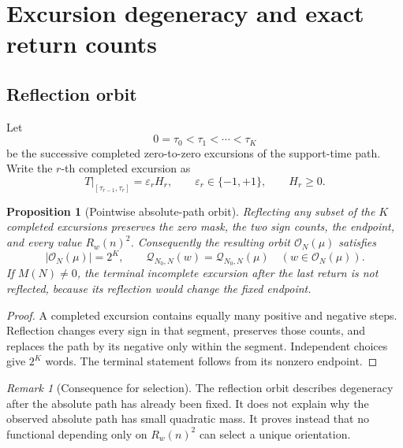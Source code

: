 \documentclass[11pt,reqno]{amsart}
\numberwithin{equation}{section}
\theoremstyle{plain}
\newtheorem{proposition}[theorem]{Proposition}
\theoremstyle{definition}
\theoremstyle{remark}
\newtheorem{remark}[theorem]{Remark}
\newcommand{\QF}{\mathcal Q}
\newcommand{\cO}{\mathcal O}
\begin{document}
\section{Excursion degeneracy and exact return counts}
\label{sec:excursion-geometry}

\subsection{Reflection orbit}
\label{subsec:reflection-orbit}

Let
\begin{equation}
0=\tau_0<\tau_1<\cdots<\tau_K
\label{eq:completed-return-times}
\end{equation}
be the successive completed zero-to-zero excursions of the support-time path.
Write the \(r\)-th completed excursion as
\begin{equation}
T|_{[\tau_{r-1},\tau_r]}=\varepsilon_rH_r,\qquad
\varepsilon_r\in\{-1,+1\},\qquad H_r\geq0.
\label{eq:excursion-decomposition}
\end{equation}

\begin{proposition}[Pointwise absolute-path orbit]
\label{prop:reflection-orbit}
Reflecting any subset of the \(K\) completed excursions preserves the zero
mask, the two sign counts, the endpoint, and every value \(R_w(n)^2\).
Consequently the resulting orbit \(\cO_N(\mu)\) satisfies
\begin{equation}
|\cO_N(\mu)|=2^K,\qquad
\QF_{N_0,N}(w)=\QF_{N_0,N}(\mu)
\quad(w\in\cO_N(\mu)).
\label{eq:reflection-orbit-size}
\end{equation}
If \(M(N)\neq0\), the terminal incomplete excursion after the last return is
not reflected, because its reflection would change the fixed endpoint.
\end{proposition}

\begin{proof}
A completed excursion contains equally many positive and negative steps.
Reflection changes every sign in that segment, preserves those counts, and
replaces the path by its negative only within the segment.  Independent
choices give \(2^K\) words.  The terminal statement follows from its nonzero
endpoint.
\end{proof}

\begin{remark}[Consequence for selection]
\label{rem:reflection-selection-limit}
The reflection orbit describes degeneracy after the absolute path has already
been fixed.  It does not explain why the observed absolute path has small
quadratic mass.  It proves instead that no functional depending only on
\(R_w(n)^2\) can select a unique orientation.
\end{remark}
\end{document}
